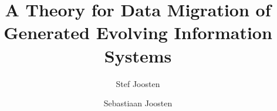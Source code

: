 \documentclass{elsarticle}
\begin{document}





\title{A Theory for Data Migration of Generated Evolving Information Systems}
\author[ou,ordina]{Stef Joosten}
\author[umn]{Sebastiaan Joosten}
\address[ou]{Open Universiteit Nederland, Heerlen, the Netherlands}
\address[ordina]{Ordina NV, Nieuwegein, the Netherlands}
\address[umn]{University of Minnesota, Minneapolis, USA}
\end{document}
